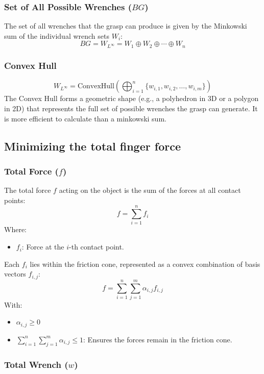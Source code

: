 \documentclass[12pt]{article}
\begin{document}
\subsubsection{Set of All Possible Wrenches (\(BG\))}

The set of all wrenches that the grasp can produce is given by the Minkowski sum of the individual wrench sets \(W_i\):
\[
BG = W_{L^\infty} = W_1 \oplus W_2 \oplus \cdots \oplus W_n
\]

\subsubsection{Convex Hull}
\[
W_{L^\infty} = \text{ConvexHull}\left( \bigoplus_{i=1}^{n} \{w_{i,1}, w_{i,2}, \ldots, w_{i,m}\} \right)
\]
The Convex Hull forms a geometric shape (e.g., a polyhedron in 3D or a polygon in 2D) that represents the full set of possible wrenches the grasp can generate. It is more efficient to calculate than a minkowski sum.

\subsection{Minimizing the total finger force}
\subsubsection{Total Force (\(f\))}

The total force \(f\) acting on the object is the sum of the forces at all contact points:
\[
f = \sum_{i=1}^{n} f_i
\]
Where:
\begin{itemize}
    \item \(f_i\): Force at the \(i\)-th contact point.
\end{itemize}

Each \(f_i\) lies within the friction cone, represented as a convex combination of basis vectors \(f_{i,j}\):
\[
f = \sum_{i=1}^{n} \sum_{j=1}^{m} \alpha_{i,j} f_{i,j}
\]
With:
\begin{itemize}
    \item \(\alpha_{i,j} \geq 0\)
    \item \(\sum_{i=1}^{n} \sum_{j=1}^{m} \alpha_{i,j} \leq 1\): Ensures the forces remain in the friction cone.
\end{itemize}

\subsubsection{Total Wrench (\(w\))}
\end{document}
